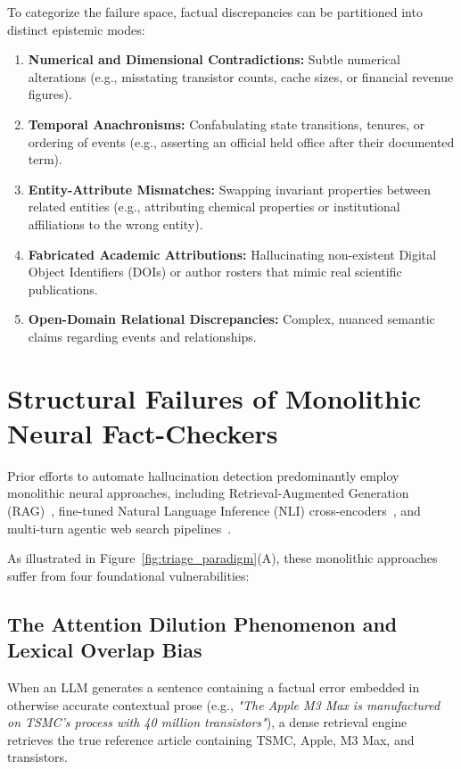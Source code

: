 To categorize the failure space, factual discrepancies can be partitioned into distinct epistemic modes:
\begin{enumerate}
    \item \textbf{Numerical and Dimensional Contradictions:} Subtle numerical alterations (e.g., misstating transistor counts, cache sizes, or financial revenue figures).
    \item \textbf{Temporal Anachronisms:} Confabulating state transitions, tenures, or ordering of events (e.g., asserting an official held office after their documented term).
    \item \textbf{Entity-Attribute Mismatches:} Swapping invariant properties between related entities (e.g., attributing chemical properties or institutional affiliations to the wrong entity).
    \item \textbf{Fabricated Academic Attributions:} Hallucinating non-existent Digital Object Identifiers (DOIs) or author rosters that mimic real scientific publications.
    \item \textbf{Open-Domain Relational Discrepancies:} Complex, nuanced semantic claims regarding events and relationships.
\end{enumerate}

\section{Structural Failures of Monolithic Neural Fact-Checkers}
\label{sec:structural_failures}

Prior efforts to automate hallucination detection predominantly employ monolithic neural approaches, including Retrieval-Augmented Generation (RAG)~\cite{lewis2020retrieval}, fine-tuned Natural Language Inference (NLI) cross-encoders~\cite{tang2024minicheck,he2023deberta}, and multi-turn agentic web search pipelines~\cite{wei2024safe,gao2023factool}. 

As illustrated in Figure~\ref{fig:triage_paradigm}(A), these monolithic approaches suffer from four foundational vulnerabilities:

\subsection{The Attention Dilution Phenomenon and Lexical Overlap Bias}
When an LLM generates a sentence containing a factual error embedded in otherwise accurate contextual prose (e.g., \textit{"The Apple M3 Max is manufactured on TSMC's process with 40 million transistors"}), a dense retrieval engine retrieves the true reference article containing TSMC, Apple, M3 Max, and transistors. 

